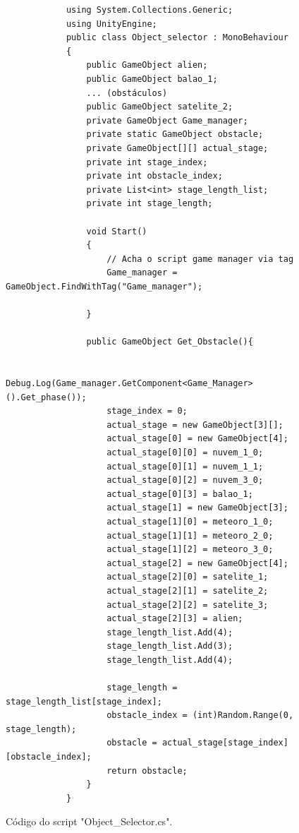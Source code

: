     \begin{figure}[ht!]
        \centering
        \begin{lstlisting}
            using System.Collections.Generic;
            using UnityEngine;
            public class Object_selector : MonoBehaviour
            {
                public GameObject alien;
                public GameObject balao_1;
                ... (obstáculos)
                public GameObject satelite_2;
                private GameObject Game_manager;
                private static GameObject obstacle;
                private GameObject[][] actual_stage;
                private int stage_index;
                private int obstacle_index;
                private List<int> stage_length_list;
                private int stage_length;

                void Start()
                {
                    // Acha o script game manager via tag
                    Game_manager = GameObject.FindWithTag("Game_manager");

                }

                public GameObject Get_Obstacle(){
                    
                    Debug.Log(Game_manager.GetComponent<Game_Manager>().Get_phase());
                    stage_index = 0;
                    actual_stage = new GameObject[3][];
                    actual_stage[0] = new GameObject[4];
                    actual_stage[0][0] = nuvem_1_0;
                    actual_stage[0][1] = nuvem_1_1;
                    actual_stage[0][2] = nuvem_3_0;
                    actual_stage[0][3] = balao_1;
                    actual_stage[1] = new GameObject[3];
                    actual_stage[1][0] = meteoro_1_0;
                    actual_stage[1][1] = meteoro_2_0;
                    actual_stage[1][2] = meteoro_3_0;
                    actual_stage[2] = new GameObject[4];
                    actual_stage[2][0] = satelite_1;
                    actual_stage[2][1] = satelite_2;
                    actual_stage[2][2] = satelite_3;
                    actual_stage[2][3] = alien;
                    stage_length_list.Add(4);
                    stage_length_list.Add(3);
                    stage_length_list.Add(4);

                    stage_length = stage_length_list[stage_index];
                    obstacle_index = (int)Random.Range(0, stage_length);
                    obstacle = actual_stage[stage_index][obstacle_index];
                    return obstacle;
                }
            }
        \end{lstlisting}
        \caption{Código do script "Object\_Selector.cs".}
        \label{code:object_selector}
    \end{figure}


